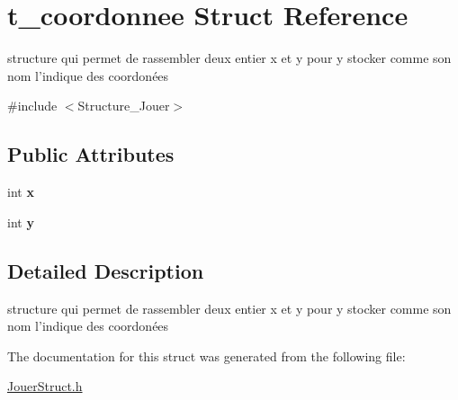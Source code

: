 \hypertarget{structt__coordonnee}{}\section{t\+\_\+coordonnee Struct Reference}
\label{structt__coordonnee}


structure qui permet de rassembler deux entier x et y pour y stocker comme son nom l’indique des coordonées  




{\ttfamily \#include $<$Structure\+\_\+\+Jouer$>$}

\subsection*{Public Attributes}
\begin{DoxyCompactItemize}
\item 
\hypertarget{structt__coordonnee_adc43d2ee9bc8331939123bf7f019a5f6}{}int {\bfseries x}\label{structt__coordonnee_adc43d2ee9bc8331939123bf7f019a5f6}

\item 
\hypertarget{structt__coordonnee_a59976d5ac64eac95bdbe12b4453f1af3}{}int {\bfseries y}\label{structt__coordonnee_a59976d5ac64eac95bdbe12b4453f1af3}

\end{DoxyCompactItemize}


\subsection{Detailed Description}
structure qui permet de rassembler deux entier x et y pour y stocker comme son nom l’indique des coordonées 

The documentation for this struct was generated from the following file\+:\begin{DoxyCompactItemize}
\item 
\hyperlink{_jouer_struct_8h}{Jouer\+Struct.\+h}\end{DoxyCompactItemize}
